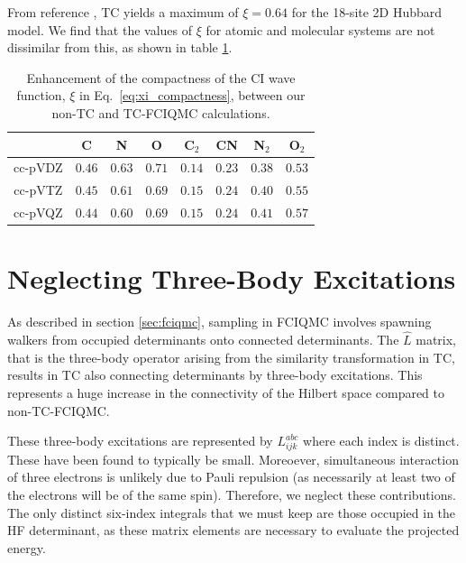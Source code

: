 From reference , TC yields a maximum of $\xi=0.64$ for the 18-site 2D Hubbard model. We find that the values of $\xi$ for atomic and molecular systems are not dissimilar from this, as shown in table \ref{table:l2_norms}.
%
\begin{table}[htbp]
    \centering
    \begin{tabular}{cccccccc}
            & C      & N      & O      &
              C$_2$  & CN     & N$_2$  & O$_2$  \\
    \hline \hline
    cc-pVDZ & $0.46$ & $0.63$ & $0.71$
            & $0.14$ & $0.23$ & $0.38$ & $0.53$ \\
    cc-pVTZ & $0.45$ & $0.61$ & $0.69$
            & $0.15$ & $0.24$ & $0.40$ & $0.55$ \\
    cc-pVQZ & $0.44$ & $0.60$ & $0.69$
            & $0.15$ & $0.24$ & $0.41$ & $0.57$ \\
    \hline
    \end{tabular}
    \caption{
      Enhancement of the compactness of the CI wave function, $\xi$ in
      Eq.\ \ref{eq:xi_compactness}, between our non-TC and TC-FCIQMC
      calculations.
    }
    \label{table:l2_norms}
  \end{table}

\section{Neglecting Three-Body Excitations}

As described in section \ref{sec:fciqmc}, sampling in FCIQMC involves spawning walkers from occupied determinants onto connected determinants. The $\hat L$ matrix, that is the three-body operator arising from the similarity transformation in TC, results in TC also connecting determinants by three-body excitations. This represents a huge increase in the connectivity of the Hilbert space compared to non-TC-FCIQMC.

These three-body excitations are represented by $L_{ijk}^{abc}$ where each index is distinct. These have been found to typically be small.\supercite{dobrautzPerformance2022} Moreoever, simultaneous interaction of three electrons is unlikely due to Pauli repulsion (as necessarily at least two of the electrons will be of the same spin). Therefore, we neglect these contributions. The only distinct six-index integrals that we must keep are those occupied in the HF determinant, as these matrix elements are necessary to evaluate the projected energy.

